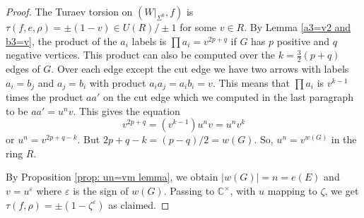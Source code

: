 \documentclass[JEP,XML,SOM,Unicode,NoFloatCountersInSection]{cedram}
\theoremstyle{plain}
\theoremstyle{definition}
\let\ve\varepsilon
\newcommand{\bC}{\mathbb{C}}\newcommand{\bD}{\mathbb{D}}
\begin{document}
\begin{proof}
The Turaev torsion on $(W|_{\Sigma^0},f)$ is $\tau(f,e,\rho)=\pm(1-v)\in U(R)/\pm 1$ for some $v\in R$. By Lemma \ref{a3=v2 and b3=v}, the product of the $a_i$ labels is $\prod a_i=v^{2p+q}$ if $G$ has $p$ positive and $q$ negative vertices. This product can also be computed over the $k=\frac32(p+q)$ edges of $G$. Over each edge except the cut edge we have two arrows with labels $a_i=b_j$ and $a_j=b_i$ with product $a_ia_j=a_ib_i=v$. This means that $\prod a_i$ is $v^{k-1}$ times the product $aa'$ on the cut edge which we computed in the last paragraph to be $a a'=u^nv$. This gives the equation
\[
v^{2p+q}=(v^{k-1})u^nv=u^nv^k
\]
or $u^n=v^{2p+q-k}$. But $2p+q-k=(p-q)/2=w(G)$. So, $u^n=v^{w(G)}$ in the ring $R$.

By Proposition \ref{prop: un=vm lemma}, we obtain $|w(G)|=n=e(E)$ and $v=u^{\ve}$ where $\ve$ is the sign of $w(G)$. Passing to $\bC^\times$, with $u$ mapping to $\zeta$, we get $\tau(f,\rho)=\pm(1-\zeta^\ve)$ as claimed.
\end{proof}
\end{document}
